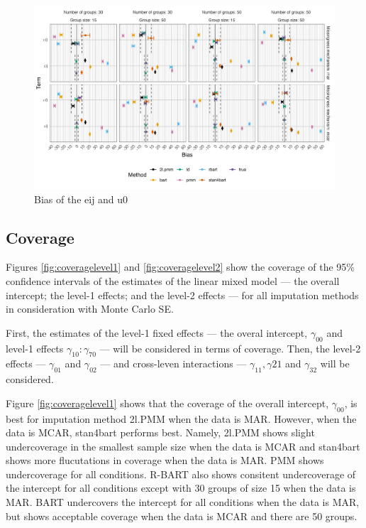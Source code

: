 \documentclass[10pt, a4paper, titlepage]{article}
\begin{document}
\begin{figure}[H]
    \centering
    \includegraphics[width=1\textwidth]{bias2.png}
    \caption{Bias of the eij and u0}
    \label{fig:bias2}
\end{figure}

\subsection{Coverage}
Figures \ref{fig:coveragelevel1} and \ref{fig:coveragelevel2} show the coverage of the 95\% confidence intervals of the estimates of the linear mixed model --- the overall intercept; the level-1 effects; and the level-2 effects --- for all imputation methods in consideration with Monte Carlo SE.

First, the estimates of the level-1 fixed effects --- the overal intercept, $\gamma_{00}$ and level-1 effects $\gamma_{10}:\gamma_{70}$ --- will be considered in terms of coverage. Then, the level-2 effects --- $\gamma_{01}$ and $\gamma_{02}$ --- and cross-leven interactions --- $\gamma_{11}, \gamma{21}$ and $\gamma_{32}$ will be considered.

Figure \ref{fig:coveragelevel1} shows that the coverage of the overall intercept, $\gamma_{00}$, is best for imputation method 2l.PMM when the data is MAR. However, when the data is MCAR, stan4bart performs best. Namely, 2l.PMM shows slight undercoverage in the smallest sample size when the data is MCAR and stan4bart shows more flucutations in coverage when the data is MAR. PMM shows undercoverage for all conditions. R-BART also shows consitent undercoverage of the intercept for all conditions except with 30 groups of size 15 when the data is MAR. BART undercovers the intercept for all conditions when the data is MAR, but shows acceptable coverage when the data is MCAR and there are 50 groups. 
\end{document}
